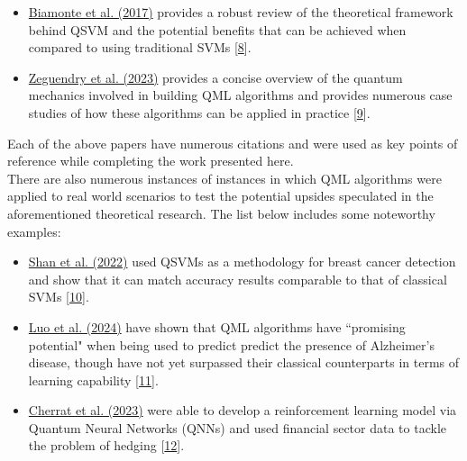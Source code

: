 \documentclass[11pt, oneside]{article}   	%
\begin{document}
\begin{itemize}

\item \href{https://doi.org/10.1038/nature23474}{Biamonte et al. (2017)} provides a robust review of the theoretical framework behind QSVM and the potential benefits that can be achieved when compared to using traditional SVMs [\href{https://doi.org/10.1038/nature23474}{8}]. 
\item \href{https://pubmed.ncbi.nlm.nih.gov/36832654/}{Zeguendry et al. (2023)} provides a concise overview of the quantum mechanics involved in building QML algorithms and provides numerous case studies of how these algorithms can be applied in practice [\href{https://doi.org/10.3390/e25020287}{9}]. 


\end{itemize}

\noindent Each of the above papers have numerous citations and were used as key points of reference while completing the work presented here. \\

There are also numerous instances of instances in which QML algorithms were applied to real world scenarios to test the potential upsides speculated in the aforementioned theoretical research. The list below includes some noteworthy examples: 

\begin{itemize}

	\item \href{https://doi.org/10.21203/rs.3.rs-1434074/v1}{Shan et al. (2022)} used QSVMs as a methodology for breast cancer detection and show that it can match accuracy results comparable to that of classical SVMs [\href{https://doi.org/10.21203/rs.3.rs-1434074/v1}{10}].
	\item \href{https://doi.org/10.48550/arXiv.2408.04543}{Luo et al. (2024)} have shown that QML algorithms have ``promising potential" when being used to predict predict the presence of Alzheimer's disease, though have not yet surpassed their classical counterparts in terms of learning capability [\href{https://doi.org/10.48550/arXiv.2408.04543}{11}].  
	\item \href{https://doi.org/10.22331/q-2023-11-29-1191}{Cherrat et al. (2023)} were able to develop a reinforcement learning model via Quantum Neural Networks (QNNs) and used financial sector data to tackle the problem of hedging [\href{https://doi.org/10.22331/q-2023-11-29-1191}{12}]. 

\end{itemize}
\end{document}

